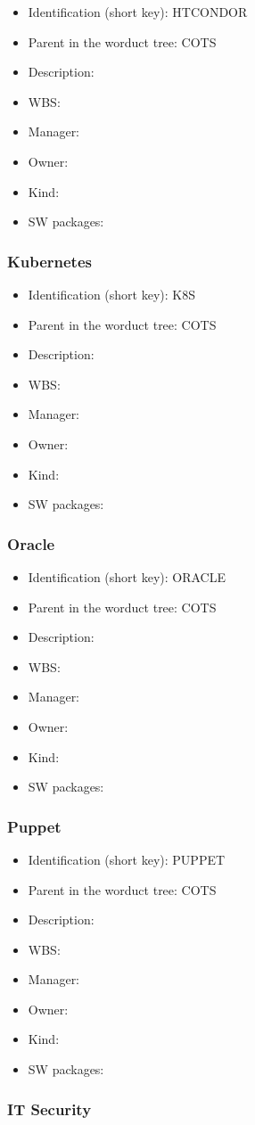\begin{itemize}\item Identification (short key): HTCONDOR
\item Parent in the worduct tree: COTS
\item Description: 
\item WBS: 
\item Manager: 
\item Owner: 
\item Kind:
\item SW packages: 
\end{itemize}\subsubsection{Kubernetes}
\begin{itemize}\item Identification (short key): K8S
\item Parent in the worduct tree: COTS
\item Description: 
\item WBS: 
\item Manager: 
\item Owner: 
\item Kind:
\item SW packages: 
\end{itemize}\subsubsection{Oracle}
\begin{itemize}\item Identification (short key): ORACLE
\item Parent in the worduct tree: COTS
\item Description: 
\item WBS: 
\item Manager: 
\item Owner: 
\item Kind:
\item SW packages: 
\end{itemize}\subsubsection{Puppet}
\begin{itemize}\item Identification (short key): PUPPET
\item Parent in the worduct tree: COTS
\item Description: 
\item WBS: 
\item Manager: 
\item Owner: 
\item Kind:
\item SW packages: 
\end{itemize}\subsubsection{IT Security}
